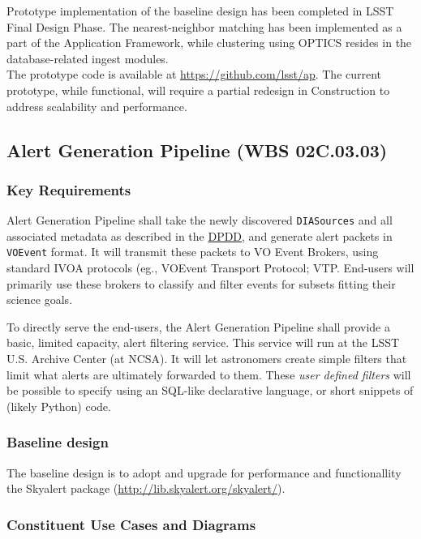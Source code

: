 \documentclass[12pt]{article}
\newcommand{\code}[1]{\texttt{#1}}
\newcommand{\DIASources}{\code{DIASources}\xspace}
\newcommand{\VOEvent}{\code{VOEvent}\xspace}
\newcommand{\ds}[2]{{\color{blue} \href{https://docushare.lsstcorp.org/docushare/dsweb/Get/#1}{#2}}\xspace}
\newcommand{\DPDD}{\ds{LSE-163}{DPDD}}
\newcommand{\wbsAP}{WBS 02C.03.03}
\begin{document}
Prototype implementation of the baseline design has been completed in LSST Final Design Phase. The nearest-neighbor matching has been implemented as a part of the Application Framework, while clustering using OPTICS resides in the database-related ingest modules.
\\

The prototype code is available at \url{https://github.com/lsst/ap}. The current prototype, while functional, will require a partial redesign in Construction to address scalability and performance.

\clearpage

\subsection{Alert Generation Pipeline (\wbsAP)}

\subsubsection{Key Requirements}

Alert Generation Pipeline shall take the newly discovered \DIASources and all associated metadata as described in the \DPDD, and generate alert packets in \VOEvent format. It will transmit these packets to VO Event Brokers, using standard IVOA protocols (eg., VOEvent Transport Protocol; VTP\@. End-users will primarily use these brokers to classify and filter events for subsets fitting their science goals.

To directly serve the end-users, the Alert Generation Pipeline shall provide a basic, limited capacity, alert filtering service. This service will run at the LSST U.S. Archive Center (at NCSA). It will let astronomers create simple filters that limit what alerts are ultimately forwarded to them. These \emph{user defined filters} will be possible to specify using an SQL-like declarative language, or short snippets of (likely Python) code.

\subsubsection{Baseline design}

The baseline design is to adopt and upgrade for performance and functionallity the Skyalert package (\url{http://lib.skyalert.org/skyalert/}).

\subsubsection{Constituent Use Cases and Diagrams}
\end{document}
